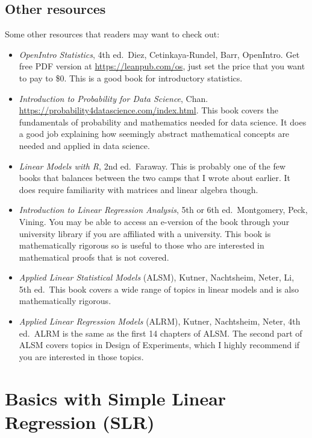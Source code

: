 \documentclass[
]{book}
\begin{document}
\section*{Other resources}\label{other-resources}

Some other resources that readers may want to check out:

\begin{itemize}
\item
  \emph{OpenIntro Statistics}, 4th ed.~Diez, Cetinkaya-Rundel, Barr, OpenIntro. Get free PDF version at \url{https://leanpub.com/os}, just set the price that you want to pay to \$0. This is a good book for introductory statistics.
\item
  \emph{Introduction to Probability for Data Science}, Chan. \url{https://probability4datascience.com/index.html}. This book covers the fundamentals of probability and mathematics needed for data science. It does a good job explaining how seemingly abstract mathematical concepts are needed and applied in data science.
\item
  \emph{Linear Models with R}, 2nd ed.~Faraway. This is probably one of the few books that balances between the two camps that I wrote about earlier. It does require familiarity with matrices and linear algebra though.
\item
  \emph{Introduction to Linear Regression Analysis}, 5th or 6th ed.~Montgomery, Peck, Vining. You may be able to access an e-version of the book through your university library if you are affiliated with a university. This book is mathematically rigorous so is useful to those who are interested in mathematical proofs that is not covered.
\item
  \emph{Applied Linear Statistical Models} (ALSM), Kutner, Nachtsheim, Neter, Li, 5th ed.~This book covers a wide range of topics in linear models and is also mathematically rigorous.
\item
  \emph{Applied Linear Regression Models} (ALRM), Kutner, Nachtsheim, Neter, 4th ed.~ALRM is the same as the first 14 chapters of ALSM. The second part of ALSM covers topics in Design of Experiments, which I highly recommend if you are interested in those topics.
\end{itemize}

\chapter{Basics with Simple Linear Regression (SLR)}\label{slr}
\end{document}
